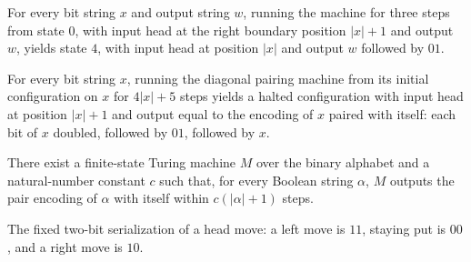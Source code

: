 \begin{lemma}
\label{Turing.pairDiag_separator}
\leanok
{}
For every bit string $x$ and output string $w$, running the machine for three steps from
state $0$, with input head at the right boundary position $|x|+1$ and output $w$, yields
state $4$, with input head at position $|x|$ and output $w$ followed by $01$.
\end{lemma}

\begin{lemma}
\label{Turing.pairDiag_run}
\leanok
{}
For every bit string $x$, running the diagonal pairing machine from its initial
configuration on $x$ for $4|x|+5$ steps yields a halted configuration with input head at
position $|x|+1$ and output equal to the encoding of $x$ paired with itself: each bit of
$x$ doubled, followed by $01$, followed by $x$.
\end{lemma}

\begin{theorem}
\label{Turing.computesFunInTime_pairEncode_diag}
\leanok
{}
There exist a finite-state Turing machine $M$ over the binary alphabet and a
natural-number constant $c$ such that, for every Boolean string $\alpha$, $M$ outputs
the pair encoding of $\alpha$ with itself within $c(|\alpha|+1)$ steps.
\end{theorem}

\begin{definition}
\label{Turing.signBits}
\leanok
The fixed two-bit serialization of a head move: a left move is $11$, staying
put is $00$, and a right move is $10$.
\end{definition}

